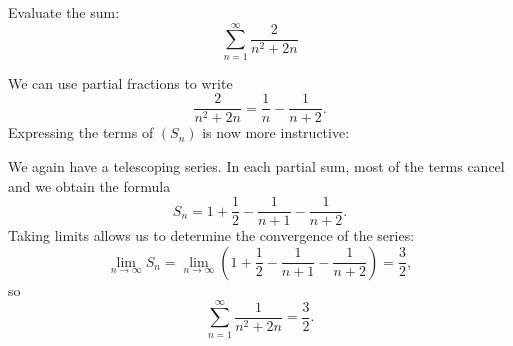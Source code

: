 \documentclass{ximera}
\begin{document}
\begin{example}
Evaluate the sum:
\[
\sum_{n=1}^\infty \frac{2}{n^2+2n}
\]
\begin{explanation}
We can use partial fractions to write
  \[
  \frac2{n^2+2n} = \frac1n-\frac1{n+2}.
  \]  
  Expressing the terms of $(S_n)$ is now more instructive:
  \begin{image}
  \end{image}
  We again have a telescoping series. In each partial sum, most of the
  terms cancel and we obtain the formula
  \[
  S_n =1+\frac12-\frac1{n+1}-\frac1{n+2}.
  \]
  Taking limits allows us to determine the convergence of the series:
  \[
  \lim_{n\to\infty}S_n = \lim_{n\to\infty} \left(1+\frac12-\frac1{n+1}-\frac1{n+2}\right) = \frac32,
  \]
  so
  \[
  \sum_{n=1}^\infty \frac1{n^2+2n} = \frac32.
  \]
\end{explanation}
\end{example}
\end{document}
